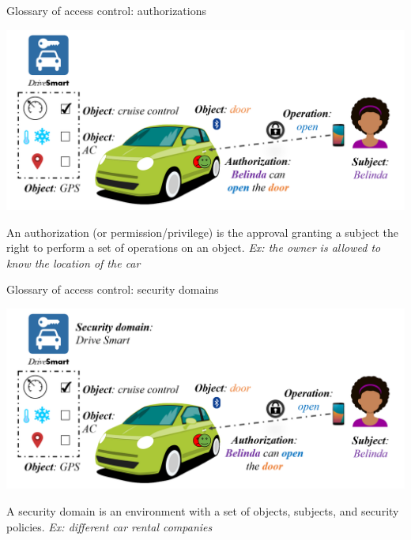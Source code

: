 \begin{frame}{Glossary of access control: authorizations}
    \begin{center}
        \includegraphics[scale=0.33]{Figures/ex_intro_5.png}
    \end{center}
    
    \begin{definition}
        An \alert{authorization} (or permission/privilege) is the approval granting a subject the right to perform a set of operations on an object.
        \newline \emph{Ex: the owner is allowed to know the location of the car}
    \end{definition}
\end{frame}

\begin{frame}{Glossary of access control: security domains}
    \begin{center}
        \includegraphics[scale=0.33]{Figures/ex_intro_6.png}
    \end{center}
    
    \begin{definition}
        A \alert{security domain} is an environment with a set of objects, subjects, and security policies.
        \newline \emph{Ex: different car rental companies}
    \end{definition}
\end{frame}

